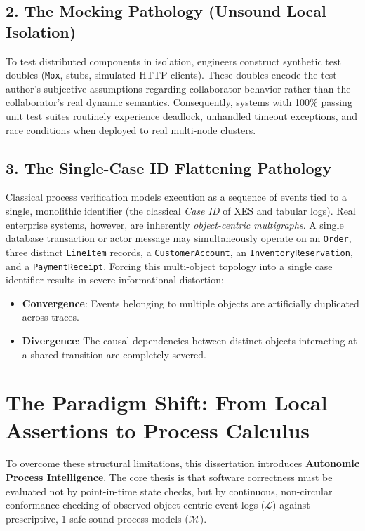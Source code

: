 \documentclass[11pt,a4paper,oneside]{book}
\theoremstyle{definition}
\begin{document}
\subsection{2. The Mocking Pathology (Unsound Local Isolation)}
To test distributed components in isolation, engineers construct synthetic test doubles (\texttt{Mox}, stubs, simulated HTTP clients). These doubles encode the test author's subjective assumptions regarding collaborator behavior rather than the collaborator's real dynamic semantics. Consequently, systems with 100\% passing unit test suites routinely experience deadlock, unhandled timeout exceptions, and race conditions when deployed to real multi-node clusters.

\subsection{3. The Single-Case ID Flattening Pathology}
Classical process verification models execution as a sequence of events tied to a single, monolithic identifier (the classical \emph{Case ID} of XES and tabular logs). Real enterprise systems, however, are inherently \emph{object-centric multigraphs}. A single database transaction or actor message may simultaneously operate on an \texttt{Order}, three distinct \texttt{LineItem} records, a \texttt{CustomerAccount}, an \texttt{InventoryReservation}, and a \texttt{PaymentReceipt}. Forcing this multi-object topology into a single case identifier results in severe informational distortion:
\begin{itemize}
    \item \textbf{Convergence}: Events belonging to multiple objects are artificially duplicated across traces.
    \item \textbf{Divergence}: The causal dependencies between distinct objects interacting at a shared transition are completely severed.
\end{itemize}

\section{The Paradigm Shift: From Local Assertions to Process Calculus}
To overcome these structural limitations, this dissertation introduces \textbf{Autonomic Process Intelligence}. The core thesis is that software correctness must be evaluated not by point-in-time state checks, but by continuous, non-circular conformance checking of observed object-centric event logs ($\mathcal{L}$) against prescriptive, 1-safe sound process models ($\mathcal{M}$).
\end{document}
